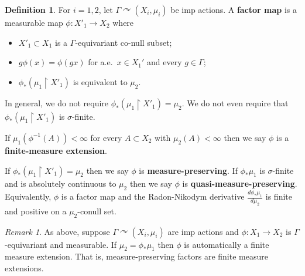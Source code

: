 \documentclass[12pt]{article}
\theoremstyle{plain}
\newtheorem{lem}[thm]{Lemma}
\theoremstyle{definition}
\newtheorem{defn}{Definition}
\theoremstyle{remark}
\newtheorem{remark}{Remark}
\newcommand{\G}{\Gamma}
\def\cc{{\curvearrowright}}
\newcommand{\resto}{\upharpoonright}
\begin{document}
\begin{defn}
For $i=1,2$, let $\G \cc (X_i,\mu_i)$ be imp actions. A {\bf factor map} is a measurable map $\phi:X'_1 \to X_2$ where 
\begin{itemize}
\item $X'_1 \subset X_1$ is a $\G$-equivariant co-null subset;
\item $g\phi(x) = \phi(gx)$ for a.e.~$x\in X_1'$ and every $g\in \G$;
\item $\phi_*(\mu_1 \resto X'_1)$ is equivalent to $\mu_2$.
\end{itemize}
In general, we do not require $\phi_*(\mu_1 \resto X'_1) = \mu_2$. We do not even require that  $\phi_*(\mu_1 \resto X'_1)$ is $\sigma$-finite.

If $\mu_1(\phi^{-1}(A))<\infty$ for every $A \subset X_2$ with $\mu_2(A)<\infty$ then we say $\phi$ is a {\bf finite-measure extension}.

If $\phi_*(\mu_1 \resto X'_1) = \mu_2$ then we say $\phi$ is {\bf measure-preserving}. If $\phi_*\mu_1$ is $\sigma$-finite and is absolutely continuous to $\mu_2$ then we say $\phi$ is {\bf quasi-measure-preserving}. Equivalently, $\phi$ is a factor map and the Radon-Nikodym derivative $\frac{d\phi_*\mu_1}{d\mu_2}$ is finite and positive on a $\mu_2$-conull set. 
\end{defn}

\begin{remark}\label{R:trivial}
As above, suppose $\G \cc (X_i,\mu_i)$ are imp actions and $\phi:X_1\to X_2$ is $\G$-equivariant and measurable. If $\mu_2 = \phi_*\mu_1$ then $\phi$ is automatically a finite measure extension. That is, measure-preserving factors are finite measure extensions.
\end{remark}




\end{document}

